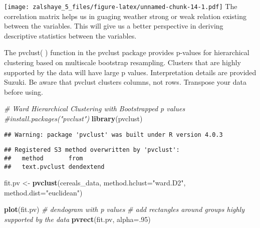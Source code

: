 \documentclass[
]{article}
\newenvironment{Shaded}{\begin{snugshade}}{\end{snugshade}}
\newcommand{\CommentTok}[1]{\textcolor[rgb]{0.56,0.35,0.01}{\textit{#1}}}
\newcommand{\DataTypeTok}[1]{\textcolor[rgb]{0.13,0.29,0.53}{#1}}
\newcommand{\DecValTok}[1]{\textcolor[rgb]{0.00,0.00,0.81}{#1}}
\newcommand{\KeywordTok}[1]{\textcolor[rgb]{0.13,0.29,0.53}{\textbf{#1}}}
\newcommand{\NormalTok}[1]{#1}
\newcommand{\StringTok}[1]{\textcolor[rgb]{0.31,0.60,0.02}{#1}}
\begin{document}
\texttt{[image: zalshaye\_5\_files/figure-latex/unnamed-chunk-14-1.pdf]}
The correlation matrix helps us in guaging weather strong or weak
relation existing between the variables. This will give us a better
perspective in deriving descriptive statistics between the variables.

The pvclust( ) function in the pvclust package provides p-values for
hierarchical clustering based on multiscale bootstrap resampling.
Clusters that are highly supported by the data will have large p values.
Interpretation details are provided Suzuki. Be aware that pvclust
clusters columns, not rows. Transpose your data before using.

\begin{Shaded}
\begin{Highlighting}[]
\CommentTok{# Ward Hierarchical Clustering with Bootstrapped p values}
\CommentTok{#install.packages("pvclust")}
\KeywordTok{library}\NormalTok{(pvclust)}
\end{Highlighting}
\end{Shaded}

\begin{verbatim}
## Warning: package 'pvclust' was built under R version 4.0.3
\end{verbatim}

\begin{verbatim}
## Registered S3 method overwritten by 'pvclust':
##   method       from      
##   text.pvclust dendextend
\end{verbatim}

\begin{Shaded}
\begin{Highlighting}[]
\NormalTok{fit.pv <-}\StringTok{ }\KeywordTok{pvclust}\NormalTok{(cereals_data, }\DataTypeTok{method.hclust=}\StringTok{"ward.D2"}\NormalTok{,}
               \DataTypeTok{method.dist=}\StringTok{"euclidean"}\NormalTok{)}
\end{Highlighting}
\end{Shaded}

\begin{Shaded}
\begin{Highlighting}[]
\KeywordTok{plot}\NormalTok{(fit.pv) }\CommentTok{# dendogram with p values}
\CommentTok{# add rectangles around groups highly supported by the data}
\KeywordTok{pvrect}\NormalTok{(fit.pv, }\DataTypeTok{alpha=}\NormalTok{.}\DecValTok{95}\NormalTok{)}
\end{Highlighting}
\end{Shaded}
\end{document}

